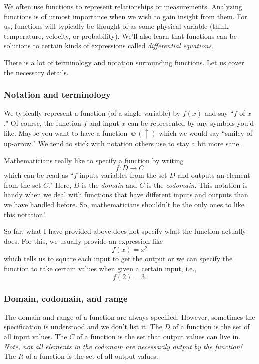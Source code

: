     We often use functions to represent relationships or measurements.  Analyzing functions is of utmost importance when we wish to gain insight from them.  For us, functions will typically be thought of as some physical variable (think temperature, velocity, or probability). We'll also learn that functions can be solutions to certain kinds of expressions called \emph{differential equations}.

    There is a lot of terminology and notation surrounding functions. Let us cover the necessary details.

    \subsubsection{Notation and terminology}

    We typically represent a function (of a single variable) by $f(x)$ and say ``$f$ of $x$." Of course, the function $f$ and input $x$ can be represented by any symbols you'd like.  Maybe you want to have a function $\smiley(\uparrow)$ which we would say ``smiley of up-arrow." We tend to stick with notation others use to stay a bit more sane.

    Mathematicians really like to specify a function by writing
    \[
    f\colon D \to C
    \]
    which can be read as ``$f$ inputs variables from the set $D$ and outputs an element from the set $C$." Here, $D$ is the \emph{domain} and $C$ is the \emph{codomain}. This notation is handy when we deal with functions that have different inputs and outputs than we have handled before. So, mathematicians shouldn't be the only ones to like this notation!

    So far, what I have provided above does not specify what the function actually does.  For this, we usually provide an expression like
    \[
    f(x)=x^2
    \]
    which tells us to square each input to get the output or we can specify the function to take certain values when given a certain input, i.e.,
    \[
    f(2)=3.
    \]


    \subsubsection{Domain, codomain, and range}

    The domain and range of a function are always specified. However, sometimes the specification is understood and we don't list it.  The  $D$ of a function is the set of all input values.  The  $C$ of a function is the set that output values can live in.  \emph{Note, \underline{not} all elements in the codomain are necessarily output by the function!} The  $R$ of a function is the set of all output values.

